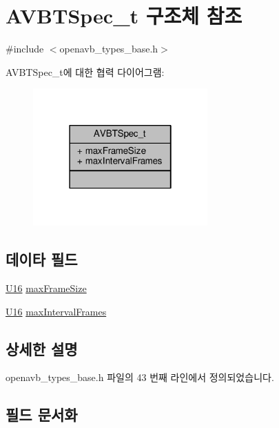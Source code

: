 \hypertarget{struct_a_v_b_t_spec__t}{}\section{A\+V\+B\+T\+Spec\+\_\+t 구조체 참조}
\label{struct_a_v_b_t_spec__t}


{\ttfamily \#include $<$openavb\+\_\+types\+\_\+base.\+h$>$}



A\+V\+B\+T\+Spec\+\_\+t에 대한 협력 다이어그램\+:
\nopagebreak
\begin{figure}[H]
\begin{center}
\leavevmode
\includegraphics[width=190pt]{struct_a_v_b_t_spec__t__coll__graph}
\end{center}
\end{figure}
\subsection*{데이타 필드}
\begin{DoxyCompactItemize}
\item 
\hyperlink{openavb__types__base__pub_8h_a0a0a322d5fa4a546d293a77ba8b4a71f}{U16} \hyperlink{struct_a_v_b_t_spec__t_ad06f76488c0370d7fcf0b26e71c07699}{max\+Frame\+Size}
\item 
\hyperlink{openavb__types__base__pub_8h_a0a0a322d5fa4a546d293a77ba8b4a71f}{U16} \hyperlink{struct_a_v_b_t_spec__t_aa6e25cae4ef3413612cb1acd7164d6f2}{max\+Interval\+Frames}
\end{DoxyCompactItemize}


\subsection{상세한 설명}


openavb\+\_\+types\+\_\+base.\+h 파일의 43 번째 라인에서 정의되었습니다.



\subsection{필드 문서화}
